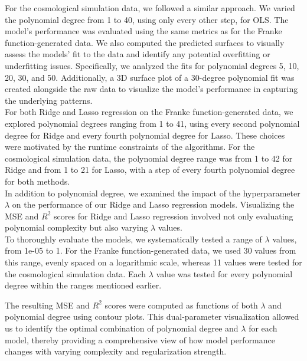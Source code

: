 \documentclass[aps,pra,english,notitlepage,reprint,nofootinbib]{revtex4-1}  %
\begin{document}
For the cosmological simulation data, we followed a similar approach. We varied the polynomial degree from 1 to 40, using only every other step, for OLS. The model's performance was evaluated using the same metrics as for the Franke function-generated data. We also computed the predicted surfaces to visually assess the models' fit to the data and identify any potential overfitting or underfitting issues. Specifically, we analyzed the fits for polynomial degrees 5, 10, 20, 30, and 50. Additionally, a 3D surface plot of a 30-degree polynomial fit was created alongside the raw data to visualize the model's performance in capturing the underlying patterns.\\

For both Ridge and Lasso regression on the Franke function-generated data, we explored polynomial degrees ranging from 1 to 41, using every second polynomial degree for Ridge and every fourth polynomial degree for Lasso. These choices were motivated by the runtime constraints of the algorithms. For the cosmological simulation data, the polynomial degree range was from 1 to 42 for Ridge and from 1 to 21 for Lasso, with a step of every fourth polynomial degree for both methods.\\

In addition to polynomial degree, we examined the impact of the hyperparameter $\lambda$ on the performance of our Ridge and Lasso regression models. Visualizing the MSE and $R^2$ scores for Ridge and Lasso regression involved not only evaluating polynomial complexity but also varying $\lambda$ values.\\

To thoroughly evaluate the models, we systematically tested a range of $\lambda$ values, from 1e-05 to 1. For the Franke function-generated data, we used 30 values from this range, evenly spaced on a logarithmic scale, whereas 11 values were tested for the cosmological simulation data. Each $\lambda$ value was tested for every polynomial degree within the ranges mentioned earlier.

The resulting MSE and $R^2$ scores were computed as functions of both $\lambda$ and polynomial degree using contour plots. This dual-parameter visualization allowed us to identify the optimal combination of polynomial degree and $\lambda$ for each model, thereby providing a comprehensive view of how model performance changes with varying complexity and regularization strength.
\end{document}
